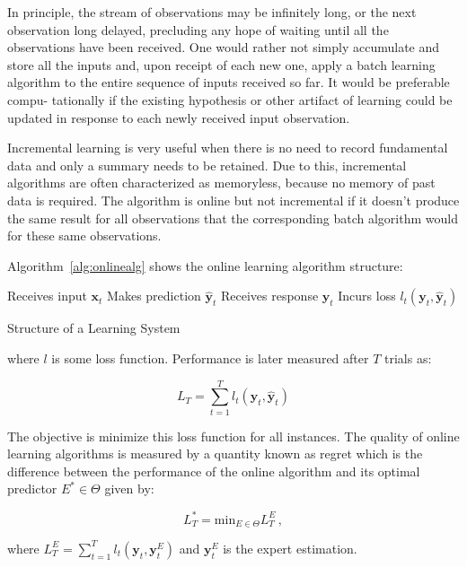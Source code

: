 In principle, the stream of observations may be infinitely long, or the next
observation long delayed, precluding any hope of waiting until all the
observations have been received. One would rather not simply accumulate and
store all the inputs and, upon receipt of each new one, apply a batch learning
algorithm to the entire sequence of inputs received so far. It would be
preferable compu- tationally if the existing hypothesis or other artifact of
learning could be updated in response to each newly received input observation.

Incremental learning is very useful when there is no need to record fundamental
data and only a summary needs to be retained. Due to this, incremental
algorithms are often characterized as memoryless, because no memory of past data
is required.  The algorithm is online but not incremental if it doesn't produce
the same result for all observations that the corresponding batch algorithm
would for these same observations.

Algorithm~\ref{alg:onlinealg} shows the online learning algorithm structure:

\begin{algorithm}[ht]
\begin{algorithmic}[1]
    \STATE Receives input $\mathbf{x}_t$
    \STATE Makes prediction $\mathbf{\hat{y}}_t$
    \STATE Receives response $\mathbf{y}_t$
    \STATE Incurs loss $l_t(\mathbf{y}_t,\mathbf{\hat{y}}_t)$
\end{algorithmic}
\caption{Structure of a Learning System}
\label{alg:onlinealg}
\end{algorithm}

\noindent where $l$ is some loss function. Performance is later measured after
$T$ trials as:

\begin{equation*}
L_T = \sum_{t=1}^T l_t(\mathbf{y}_t,\mathbf{\hat{y}}_t)
\end{equation*}

The objective is minimize this loss function for all instances.
The quality of online learning algorithms is measured by a quantity known as
regret which is the difference between the performance of the online algorithm
and its optimal predictor $E^* \in \Theta$ given by:

\begin{equation*}
L^*_T= \text{min}_{E \in \Theta} L_T^E \, ,
\end{equation*}

\noindent where $L_T^E = \sum_{t=1}^T
l_t(\mathbf{y}_t,\mathbf{y}^E_t)$ and $\mathbf{y}^E_t$ is the expert estimation. 

